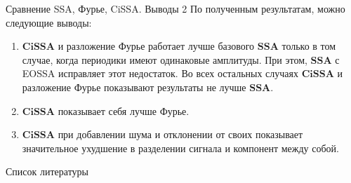 \documentclass[notheorems, handout]{beamer}
\newcommand{\SSA}{\textbf{SSA}}
\newcommand{\CISSA}{\textbf{CiSSA}}
\begin{document}
	
	\begin{frame}{Сравнение SSA, Фурье, CiSSA. Выводы 2}
		По полученным результатам, можно следующие выводы: 
		\begin{enumerate}
			\item $\CISSA$ и разложение Фурье работает лучше базового $\SSA$ только в том случае, когда периодики имеют одинаковые амплитуды. При этом, $\SSA$ с EOSSA исправляет этот недостаток. Во всех остальных случаях $\CISSA$ и разложение Фурье показывают результаты не лучше $\SSA$. 
			\item $\CISSA$ показывает себя лучше Фурье.
			\item $\CISSA$ при добавлении шума и отклонении от своих показывает значительное ухудшение в разделении сигнала и компонент между собой.
		\end{enumerate}

	\end{frame}
	
	
	\begin{frame}[allowframebreaks]{Список литературы}
		\small
		\printbibliography
	\end{frame}

	
\end{document}
